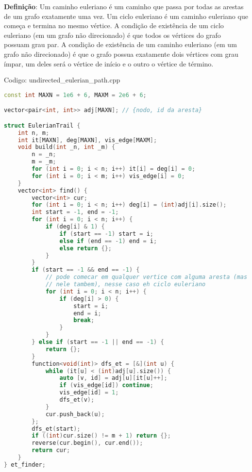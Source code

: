 \documentclass[10pt, a4paper, oneside]{book}
\begin{document}
\textbf{Definição}: Um caminho euleriano é um caminho que passa por todas as arestas de um grafo exatamente uma vez. Um ciclo euleriano é um caminho euleriano que começa e termina no mesmo vértice. A condição de existência de um ciclo euleriano (em um grafo não direcionado) é que todos os vértices do grafo possuam grau par. A condição de existência de um caminho euleriano (em um grafo não direcionado) é que o grafo possua exatamente dois vértices com grau ímpar, um deles será o vértice de início e o outro o vértice de término.

\hfill

Codigo: undirected\_eulerian\_path.cpp

\begin{lstlisting}[language=C++]
const int MAXN = 1e6 + 6, MAXM = 2e6 + 6;

vector<pair<int, int>> adj[MAXN]; // {nodo, id da aresta}

struct EulerianTrail {
    int n, m;
    int it[MAXN], deg[MAXN], vis_edge[MAXM];
    void build(int _n, int _m) {
        n = _n;
        m = _m;
        for (int i = 0; i < n; i++) it[i] = deg[i] = 0;
        for (int i = 0; i < m; i++) vis_edge[i] = 0;
    }
    vector<int> find() {
        vector<int> cur;
        for (int i = 0; i < n; i++) deg[i] = (int)adj[i].size();
        int start = -1, end = -1;
        for (int i = 0; i < n; i++) {
            if (deg[i] & 1) {
                if (start == -1) start = i;
                else if (end == -1) end = i;
                else return {};
            }
        }
        if (start == -1 && end == -1) {
            // pode comecar em qualquer vertice com alguma aresta (mas tem que terminar
            // nele tambem), nesse caso eh ciclo euleriano
            for (int i = 0; i < n; i++) {
                if (deg[i] > 0) {
                    start = i;
                    end = i;
                    break;
                }
            }
        } else if (start == -1 || end == -1) {
            return {};
        }
        function<void(int)> dfs_et = [&](int u) {
            while (it[u] < (int)adj[u].size()) {
                auto [v, id] = adj[u][it[u]++];
                if (vis_edge[id]) continue;
                vis_edge[id] = 1;
                dfs_et(v);
            }
            cur.push_back(u);
        };
        dfs_et(start);
        if ((int)cur.size() != m + 1) return {};
        reverse(cur.begin(), cur.end());
        return cur;
    }
} et_finder;
\end{lstlisting}
\hfill
\end{document}
